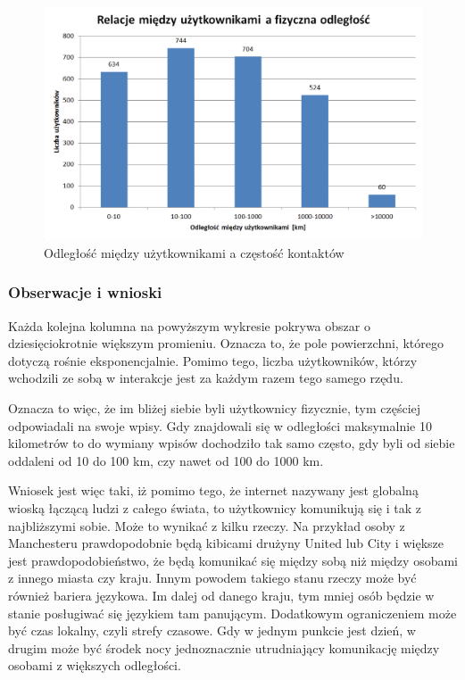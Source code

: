 \begin{figure}[ht!]
\centering
\includegraphics[width=140mm]{img/relacje-a-odleglosc.png}
\caption{Odległość między użytkownikami a częstość kontaktów}
\label{image:relacje-a-odleglosc}
\end{figure}

\subsubsection{Obserwacje i wnioski}
Każda kolejna kolumna na powyższym wykresie pokrywa obszar o dziesięciokrotnie 
większym promieniu. Oznacza to, że pole powierzchni, którego dotyczą rośnie
eksponencjalnie. Pomimo tego, liczba użytkowników, którzy wchodzili ze sobą
w interakcje jest za każdym razem tego samego rzędu.

Oznacza to więc, że im bliżej siebie byli użytkownicy fizycznie, tym częściej
odpowiadali na swoje wpisy. Gdy znajdowali się w odległości maksymalnie
10 kilometrów to do wymiany wpisów dochodziło tak samo
często, gdy byli od siebie oddaleni od 10 do 100 km, czy nawet od 100 do 1000 km.

Wniosek jest więc taki, iż pomimo tego, że internet nazywany jest globalną wioską
łączącą ludzi z całego świata, to użytkownicy komunikują się i tak z najbliższymi
sobie. Może to wynikać z kilku rzeczy. Na przykład osoby z Manchesteru 
prawdopodobnie będą kibicami drużyny United lub City i większe jest prawdopodobieństwo,
że będą komunikać się między sobą niż między osobami z innego miasta czy kraju.
Innym powodem takiego stanu rzeczy może być również bariera językowa.
Im dalej od danego kraju, tym mniej osób będzie w stanie posługiwać się językiem
tam panującym. Dodatkowym ograniczeniem może być czas lokalny, czyli strefy czasowe.
Gdy w jednym punkcie jest dzień, w drugim może być środek nocy jednoznacznie 
utrudniający komunikację między osobami z większych odległości.  

